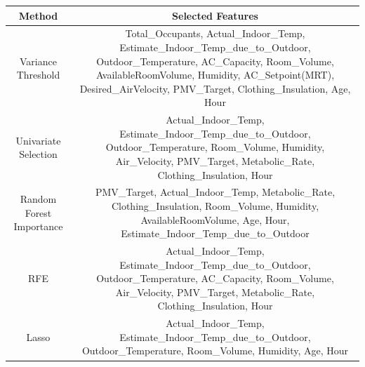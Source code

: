 \documentclass{article}%
\begin{document}
%
\begin{tabular}{|c|c|}%
\hline%
Method&Selected Features\\%
\hline%
Variance Threshold&Total\_Occupants, Actual\_Indoor\_Temp, Estimate\_Indoor\_Temp\_due\_to\_Outdoor, Outdoor\_Temperature, AC\_Capacity, Room\_Volume, AvailableRoomVolume, Humidity, AC\_Setpoint(MRT), Desired\_AirVelocity, PMV\_Target, Clothing\_Insulation, Age, Hour\\%
\hline%
Univariate Selection&Actual\_Indoor\_Temp, Estimate\_Indoor\_Temp\_due\_to\_Outdoor, Outdoor\_Temperature, Room\_Volume, Humidity, Air\_Velocity, PMV\_Target, Metabolic\_Rate, Clothing\_Insulation, Hour\\%
\hline%
Random Forest Importance&PMV\_Target, Actual\_Indoor\_Temp, Metabolic\_Rate, Clothing\_Insulation, Room\_Volume, Humidity, AvailableRoomVolume, Age, Hour, Estimate\_Indoor\_Temp\_due\_to\_Outdoor\\%
\hline%
RFE&Actual\_Indoor\_Temp, Estimate\_Indoor\_Temp\_due\_to\_Outdoor, Outdoor\_Temperature, AC\_Capacity, Room\_Volume, Air\_Velocity, PMV\_Target, Metabolic\_Rate, Clothing\_Insulation, Hour\\%
\hline%
Lasso&Actual\_Indoor\_Temp, Estimate\_Indoor\_Temp\_due\_to\_Outdoor, Outdoor\_Temperature, Room\_Volume, Humidity, Age, Hour\\%
\hline%
\end{tabular}%
\end{document}
